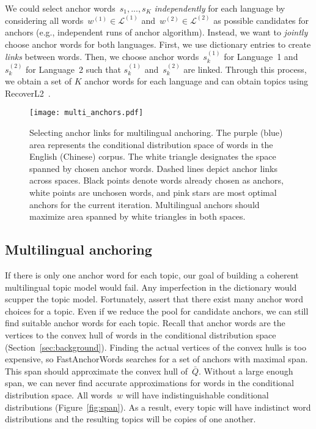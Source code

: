 We could select anchor words~$s_1,...,s_K$ \emph{independently}
for each language by considering all
words~$w^{(1)} \in \mathcal{L}^{(1)}$ and~$w^{(2)} \in \mathcal{L}^{(2)}$ as
possible candidates for anchors (e.g., independent runs of anchor
algorithm).  Instead, we want to \emph{jointly} choose anchor words for
both languages.  First, we use dictionary entries to create \emph{links} between words.  Then, we choose anchor words~$s_k^{(1)}$ for Language~1 and
$s_k^{(2)}$ for Language~2 such that
$s_k^{(1)}$ and~$s_k^{(2)}$ are linked.  Through this process, we obtain a set of
$K$ anchor words for each language and can obtain topics using
RecoverL2~\cite{arora-2013}. 

\begin{figure}
  \centering
  \texttt{[image: multi\_anchors.pdf]}
  \caption{Selecting anchor links for multilingual
    anchoring.  The purple (blue) area represents the conditional
    distribution space of words in the English (Chinese) corpus.  The white triangle designates the space spanned
    by chosen anchor words.  Dashed lines depict anchor links across
    spaces.  Black points denote words already chosen as anchors,
    white points are unchosen words, and pink stars are most optimal anchors for the current iteration.  Multilingual anchors should maximize area spanned by white triangles in both spaces.}
  \label{fig:anchors}
\end{figure}  

\subsection{Multilingual anchoring}
  \label{sec:multilingual}


If there is only one anchor word for each topic, our goal of building a coherent multilingual topic model would fail.  Any imperfection in the dictionary would scupper the topic model.  Fortunately,  assert that there exist many anchor word choices for a topic.  Even if we reduce the pool for candidate anchors, we can still find suitable anchor words for each topic.  Recall that anchor words are the vertices to the convex hull of words in the conditional distribution space (Section~\ref{sec:background}).  Finding the actual vertices of the convex hulls is too expensive, so FastAnchorWords searches for a set of anchors with maximal span.  This span should approximate the convex hull of~$\bar{Q}$.  Without a large enough span, we can never find accurate approximations for words in the conditional distribution space.  All words~$w$ will have indistinguishable conditional distributions (Figure~\ref{fig:span}).  As a result, every topic will have indistinct word distributions and the resulting topics will be copies of one another.

